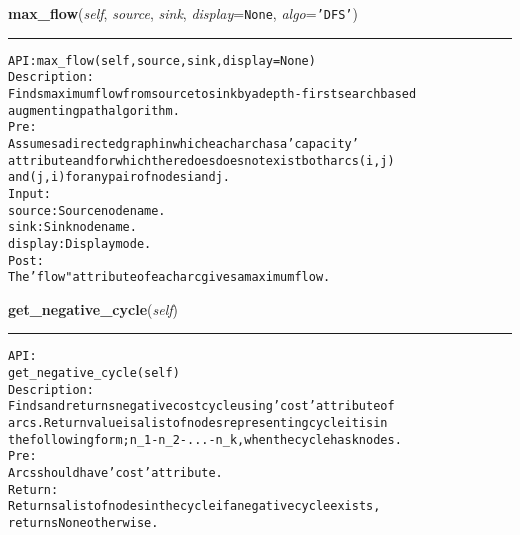     \label{coinor:gimpy:graph:Graph:max_flow}

    \vspace{0.5ex}

\hspace{.8\funcindent}\begin{boxedminipage}{\funcwidth}

    \raggedright \textbf{max\_flow}(\textit{self}, \textit{source}, \textit{sink}, \textit{display}={\tt None}, \textit{algo}={\tt \texttt{'}\texttt{DFS}\texttt{'}})

    \vspace{-1.5ex}

    \rule{\textwidth}{0.5\fboxrule}
\setlength{\parskip}{2ex}
\begin{alltt}

API: max\_flow(self, source, sink, display=None)
Description:
Finds maximum flow from source to sink by a depth-first search based
augmenting path algorithm.
Pre:
    Assumes a directed graph in which each arc has a 'capacity'
    attribute and for which there does does not exist both arcs (i,j)
    and (j, i) for any pair of nodes i and j.
Input:
    source: Source node name.
    sink: Sink node name.
    display: Display mode.
Post:
    The 'flow" attribute of each arc gives a maximum flow.
\end{alltt}

\setlength{\parskip}{1ex}
    \end{boxedminipage}

    \label{coinor:gimpy:graph:Graph:get_negative_cycle}

    \vspace{0.5ex}

\hspace{.8\funcindent}\begin{boxedminipage}{\funcwidth}

    \raggedright \textbf{get\_negative\_cycle}(\textit{self})

    \vspace{-1.5ex}

    \rule{\textwidth}{0.5\fboxrule}
\setlength{\parskip}{2ex}
\begin{alltt}

API:
    get\_negative\_cycle(self)
Description:
    Finds and returns negative cost cycle using 'cost' attribute of
    arcs. Return value is a list of nodes representing cycle it is in
    the following form; n\_1-n\_2-...-n\_k, when the cycle has k nodes.
Pre:
    Arcs should have 'cost' attribute.
Return:
    Returns a list of nodes in the cycle if a negative cycle exists,
    returns None otherwise.
\end{alltt}

\setlength{\parskip}{1ex}
    \end{boxedminipage}

